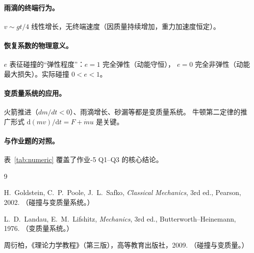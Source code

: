 \documentclass[UTF8,a4paper,11pt]{ctexart}
\begin{document}
\paragraph{雨滴的终端行为。}
$v\sim gt/4$ 线性增长，无终端速度（因质量持续增加，重力加速度恒定）。

\paragraph{恢复系数的物理意义。}
$e$ 表征碰撞的``弹性程度''：$e=1$ 完全弹性（动能守恒），
$e=0$ 完全非弹性（动能最大损失）。实际碰撞 $0<e<1$。

\paragraph{变质量系统的应用。}
火箭推进（$dm/dt<0$）、雨滴增长、砂漏等都是变质量系统。
牛顿第二定律的推广形式 $\mathrm d(mv)/\mathrm dt=F+\dot m u$ 是关键。

\paragraph{与作业题的对照。}
表~\ref{tab:numeric} 覆盖了作业-5 Q1--Q3 的核心结论。

\begin{thebibliography}{9}

H.~Goldstein, C.~P.~Poole, J.~L.~Safko,
\emph{Classical Mechanics}, 3rd ed., Pearson, 2002.
（碰撞与变质量系统。）

L.~D.~Landau, E.~M.~Lifshitz,
\emph{Mechanics}, 3rd ed., Butterworth--Heinemann, 1976.
（变质量系统。）

周衍柏，《理论力学教程》（第三版），高等教育出版社，2009.
（碰撞与变质量。）

\end{thebibliography}
\end{document}
